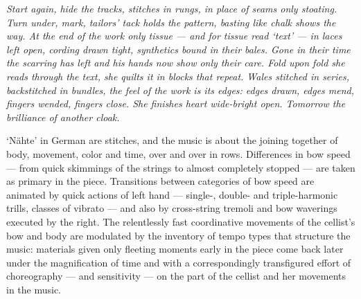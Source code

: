 \textit{Start again, hide the tracks, stitches in rungs, in place of seams only
stoating. Turn under, mark, tailors’ tack holds the pattern, basting like chalk
shows the way. At the end of the work only tissue --- and for tissue read
‘text’ --- in laces left open, cording drawn tight, synthetics bound in their
bales. Gone in their time the scarring has left and his hands now show only
their care. Fold upon fold she reads through the text, she quilts it in blocks
that repeat. Wales stitched in series, backstitched in bundles, the feel of the
work is its edges: edges drawn, edges mend, fingers wended, fingers close. She
finishes heart wide-bright open. Tomorrow the brilliance of another cloak.}

`Nähte' in German are stitches, and the music is about the joining together of
body, movement, color and time, over and over in rows. Differences in bow speed
--- from quick skimmings of the strings to almost completely stopped --- are
taken as primary in the piece. Transitions between categories of bow speed are
animated by quick actions of left hand — single-, double- and triple-harmonic
trills, classes of vibrato --- and also by cross-string tremoli and bow
waverings executed by the right. The relentlessly fast coordinative movements
of the cellist’s bow and body are modulated by the inventory of tempo types
that structure the music: materials given only fleeting moments early in the
piece come back later under the magnification of time and with a
correspondingly transfigured effort of choreography --- and sensitivity --- on
the part of the cellist and her movements in the music.
